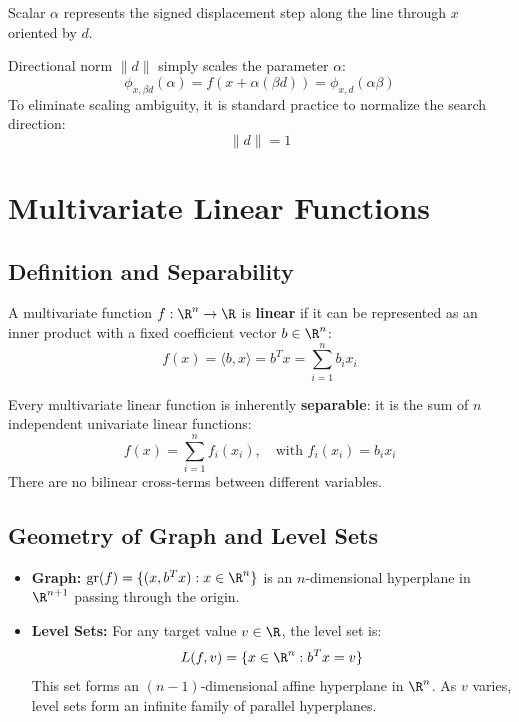 Scalar $\alpha$ represents the signed displacement step along the line through $x$ oriented by $d$.

Directional norm $\|d\|$ simply scales the parameter $\alpha$:
\begin{equation}
\phi_{x, \beta d}(\alpha) = f(x + \alpha (\beta d)) = \phi_{x, d}(\alpha \beta)
\end{equation}
To eliminate scaling ambiguity, it is standard practice to normalize the search direction:
\begin{equation}
\|d\| = 1
\end{equation}


\FloatBarrier
\section{Multivariate Linear Functions}
\label{sec:opt-multivariate-linear-functions-en}

\subsection{Definition and Separability}
A multivariate function $f: \R^n \to \R$ is \textbf{linear} if it can be represented as an inner product with a fixed coefficient vector $b \in \R^n$:
\begin{equation}
f(x) = \langle b, x \rangle = b^T x = \sum_{i=1}^n b_i x_i
\end{equation}

Every multivariate linear function is inherently \textbf{separable}: it is the sum of $n$ independent univariate linear functions:
\begin{equation}
f(x) = \sum_{i=1}^n f_i(x_i), \quad \text{with } f_i(x_i) = b_i x_i
\end{equation}
There are no bilinear cross-terms between different variables.

\subsection{Geometry of Graph and Level Sets}
\begin{itemize}
    \item \textbf{Graph:} $\text{gr}(f) = \{(x, b^T x) : x \in \R^n\}$ is an $n$-dimensional hyperplane in $\R^{n+1}$ passing through the origin.
    \item \textbf{Level Sets:} For any target value $v \in \R$, the level set is:
    \begin{equation}
    L(f, v) = \{x \in \R^n : b^T x = v\}
    \end{equation}
    This set forms an $(n-1)$-dimensional affine hyperplane in $\R^n$. As $v$ varies, level sets form an infinite family of parallel hyperplanes.
\end{itemize}

